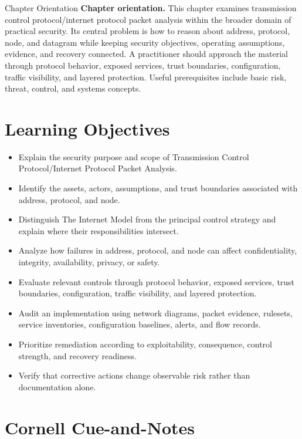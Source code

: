 \documentclass[11pt,letterpaper]{article}
\title{\CornellDocumentTitle}
\author{}
\date{}
\begin{document}
\maketitle
\begin{CornellOverviewBox}{Chapter Orientation}
\textbf{Chapter orientation.} This chapter examines transmission control protocol/internet protocol packet analysis within the broader domain of practical security. Its central problem is how to reason about address, protocol, node, and datagram while keeping security objectives, operating assumptions, evidence, and recovery connected. A practitioner should approach the material through protocol behavior, exposed services, trust boundaries, configuration, traffic visibility, and layered protection. Useful prerequisites include basic risk, threat, control, and systems concepts.
\end{CornellOverviewBox}
\section*{Learning Objectives}
\begin{itemize}
\item Explain the security purpose and scope of Transmission Control Protocol/Internet Protocol Packet Analysis.
\item Identify the assets, actors, assumptions, and trust boundaries associated with address, protocol, and node.
\item Distinguish The Internet Model from the principal control strategy and explain where their responsibilities intersect.
\item Analyze how failures in address, protocol, and node can affect confidentiality, integrity, availability, privacy, or safety.
\item Evaluate relevant controls through protocol behavior, exposed services, trust boundaries, configuration, traffic visibility, and layered protection.
\item Audit an implementation using network diagrams, packet evidence, rulesets, service inventories, configuration baselines, alerts, and flow records.
\item Prioritize remediation according to exploitability, consequence, control strength, and recovery readiness.
\item Verify that corrective actions change observable risk rather than documentation alone.
\end{itemize}
\section*{Cornell Cue-and-Notes}
\end{document}
